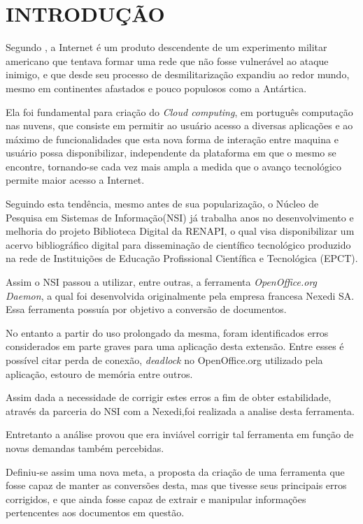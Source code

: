 \chapter{INTRODUÇÃO}
\thispagestyle{empty}

Segundo \cite{TESLA}, a Internet é um produto descendente de um experimento militar americano que tentava formar uma rede que não fosse vulnerável ao ataque inimigo, e que desde seu processo de desmilitarização expandiu ao redor mundo, mesmo em continentes afastados e pouco populosos como a Antártica.  

Ela foi fundamental para criação do \textit{Cloud computing}, em português computação nas nuvens, que consiste em permitir ao usuário acesso a diversas aplicações e ao máximo de funcionalidades que esta nova forma de interação entre maquina e usuário possa disponibilizar, independente da plataforma em que o mesmo se encontre, tornando-se cada vez mais ampla a medida que o avanço tecnológico permite maior acesso a Internet.

Seguindo esta tendência, mesmo antes de sua popularização, o Núcleo de Pesquisa em Sistemas de Informação(NSI) já trabalha anos no desenvolvimento e melhoria do projeto Biblioteca Digital da RENAPI, o qual visa disponibilizar um acervo bibliográfico digital para disseminação de científico tecnológico produzido na rede de Instituições de Educação Profissional Científica e Tecnológica (EPCT).

Assim o NSI passou a utilizar, entre outras, a ferramenta \textit{OpenOffice.org Daemon}, a qual foi desenvolvida originalmente pela empresa francesa Nexedi SA. Essa ferramenta possuía por objetivo a conversão de documentos.

No entanto a partir do uso prolongado da mesma, foram identificados erros considerados em parte graves para uma aplicação desta extensão. Entre esses é possível citar perda de conexão, \textit{deadlock} no OpenOffice.org utilizado pela aplicação, estouro de memória entre outros.

Assim dada a necessidade de corrigir estes erros a fim de obter estabilidade, através da parceria do NSI com a Nexedi,foi realizada a analise desta ferramenta.

Entretanto a análise provou que era inviável corrigir tal ferramenta em função de novas demandas também percebidas.

Definiu-se assim uma nova meta, a proposta da criação de uma ferramenta que fosse capaz de manter as conversões desta, mas que tivesse seus principais erros corrigidos, e que ainda fosse capaz de extrair e manipular informações pertencentes aos documentos em questão.

